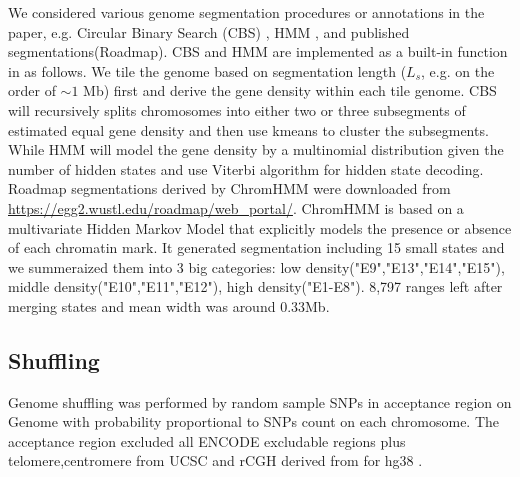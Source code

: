 \documentclass{article}
\begin{document}
We considered various genome segmentation procedures or annotations in the paper, e.g. Circular Binary Search (CBS) \citep{cbs}, HMM \citep{rcpphmm}, and published segmentations(Roadmap). CBS and HMM are implemented as a built-in function in \nullranges as follows. We tile the genome based on segmentation length ($L_s$, e.g. on the order of ${\sim}1$ Mb) first and derive the gene density within each tile genome. CBS will recursively splits chromosomes into either two or three subsegments of estimated equal gene density and then use kmeans to cluster the subsegments. While HMM will model the gene density by a multinomial distribution given the number of hidden states and use Viterbi algorithm for hidden state decoding. Roadmap segmentations derived by ChromHMM \citep{ernst2012chromhmm} were downloaded from \url{https://egg2.wustl.edu/roadmap/web_portal/}. ChromHMM is based on a multivariate Hidden Markov Model that explicitly models the presence or absence of each chromatin mark. It generated segmentation including 15 small states and we summeraized them into 3 big categories: low density("E9","E13","E14","E15"), middle density("E10","E11","E12"), high density("E1-E8"). 8,797 ranges left after merging states and mean width was around 0.33Mb. 

\subsection{Shuffling}\label{sec:shuffle}
Genome shuffling was performed by random sample SNPs in acceptance region on Genome with probability proportional to SNPs count on each chromosome. The acceptance region excluded all ENCODE excludable regions plus telomere,centromere from UCSC and rCGH derived from  for hg38 \citep{excluderanges}.
\end{document}
